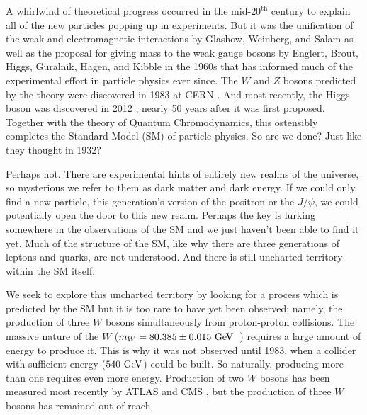 A whirlwind of theoretical progress occurred in the mid-$20^{\textrm{th}}$ century
to explain all of the new particles popping up in experiments. 
But it was the unification of the weak and electromagnetic interactions
by Glashow, Weinberg, and Salam \cite{glashow:1961tr,Salam:1968rm,weinberg:1967tq}
as well as the proposal for giving
mass to the weak gauge bosons by Englert, Brout, Higgs, Guralnik, Hagen,
and Kibble 
\cite{PhysRevLett.13.321,PhysRevLett.13.508,PhysRevLett.13.585}
in the 1960s that has informed much of the 
experimental effort in particle
physics ever since. The $W$ and $Z$ bosons predicted by the theory were 
discovered in 
1983 at CERN \cite{ARNISON1983103,ua1zobs}. 
And most recently, the Higgs boson was 
discovered in 2012 \cite{Aad20121,Chatrchyan:2012xdj},
nearly 50 years after it was first proposed. Together with the 
theory of Quantum Chromodynamics, this ostensibly completes the Standard 
Model (SM) of particle physics. 
So are we done? Just like they thought in 1932?


Perhaps not. There are experimental hints of entirely new realms of the universe, 
so mysterious we refer to them as dark matter and dark energy. 
If we could only find a new particle, this generation's version of the positron
or the $J/\psi$, we could potentially open the door to this new realm.
Perhaps the key is lurking somewhere in the observations of the SM and we 
just haven't been 
able to find it yet.  Much of the structure
of the SM, like why there are three generations of 
leptons and quarks, are not understood.
And there is still uncharted territory within the SM itself.

We seek to explore this uncharted territory by looking for a 
process which is predicted
by the SM but it is too rare to have yet been observed;  namely, the 
production of 
three $W$ bosons simultaneously from proton-proton collisions. The massive 
nature of the 
$W$ ($m_W = 80.385 \pm 0.015\GeV$~\cite{PDG:2014}) requires a large amount 
of energy 
to produce it. This is why it was not observed until 1983, when a 
collider with sufficient
energy ($540 \GeV$) could be built. So naturally, producing more than one requires
even more energy. Production of two $W$ bosons has been measured most recently 
by ATLAS \cite{Aad:2016wpd} and CMS \cite{Chatrchyan:2013oev}, but 
the production of three $W$ bosons has remained out of reach. 


